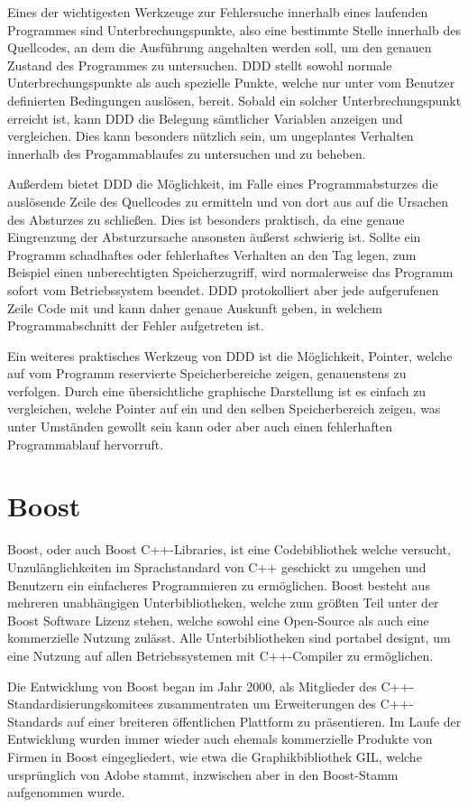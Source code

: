 Eines der wichtigesten Werkzeuge zur Fehlersuche innerhalb eines laufenden Programmes sind Unterbrechungspunkte, also eine bestimmte Stelle innerhalb des Quellcodes, an dem die Ausführung angehalten werden 
soll, um den genauen Zustand des Programmes zu untersuchen. DDD stellt sowohl normale Unterbrechungspunkte als auch spezielle Punkte, welche nur unter vom Benutzer definierten Bedingungen auslösen, bereit.
Sobald ein solcher Unterbrechungspunkt erreicht ist, kann DDD die Belegung sämtlicher Variablen anzeigen und vergleichen. Dies kann besonders nützlich sein, um ungeplantes Verhalten innerhalb des
Progamm\-ablaufes zu untersuchen und zu beheben. 

Außerdem bietet DDD die Möglichkeit, im Falle eines Programmabsturzes die auslösende Zeile des Quellcodes zu ermitteln und von dort aus auf die Ursachen des Absturzes zu schließen. Dies ist besonders
praktisch, da eine genaue Eingrenzung der Absturzursache ansonsten äußerst schwierig ist. Sollte ein Programm schadhaftes oder fehlerhaftes Verhalten an den Tag legen, zum Beispiel einen unberechtigten Speicherzugriff,
wird normalerweise das Programm sofort vom Betriebssystem beendet. DDD protokolliert aber jede aufgerufenen Zeile Code mit und kann daher genaue Auskunft geben, in welchem Programmabschnitt der
Fehler aufgetreten ist.

Ein weiteres praktisches Werkzeug von DDD ist die Möglichkeit, Pointer, welche auf vom Programm reservierte Speicherbereiche zeigen, genauenstens zu verfolgen. Durch eine übersichtliche graphische Darstellung
ist es einfach zu vergleichen, welche Pointer auf ein und den selben Speicherbereich zeigen, was unter Umständen gewollt sein kann oder aber auch einen fehlerhaften Programmablauf hervorruft.

\section{Boost}
\label{sec:boost}
Boost, oder auch Boost C++-Libraries, ist eine Codebibliothek welche versucht, Un\-zu\-läng\-lich\-keiten im Sprachstandard von C++ geschickt zu umgehen und Benutzern ein einfacheres Programmieren zu ermöglichen.
Boost besteht aus mehreren unabhängigen Unterbibliotheken, welche zum größten Teil unter der Boost Software Lizenz stehen, welche sowohl eine Open-Source als auch eine kommerzielle Nutzung zulässt. Alle
Unterbibliotheken sind portabel designt, um eine Nutzung auf allen Betriebssystemen mit C++-Compiler zu ermöglichen. 

Die Entwicklung von Boost began im Jahr 2000, als Mitglieder des C++\--Standardisierungs\-komitees zusammentraten um Erweiterungen des C++-Standards auf einer breiteren öffentlichen Plattform zu präsentieren.
Im Laufe der Entwicklung wurden immer wieder auch ehemals kommerzielle Produkte von Firmen in Boost eingegliedert, wie etwa die Graphikbibliothek GIL, welche ursprünglich von Adobe stammt, inzwischen
aber in den Boost-Stamm aufgenommen wurde.

